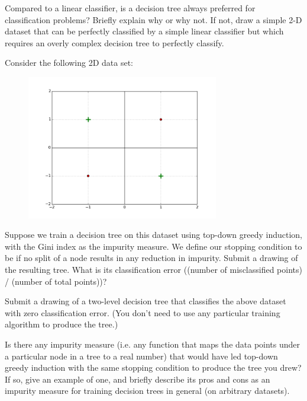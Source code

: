 \problem[4]
Compared to a linear classifier, is a decision tree always preferred for classification problems? Briefly explain why or why not. If not, draw a simple 2-D dataset that can be perfectly classified by a simple linear classifier but which requires an overly complex decision tree to perfectly classify.

\begin{solution}
  
\end{solution}

\problem[15]
Consider the following 2D data set:
\begin{figure}[H]
    \begin{center}
    \includegraphics[width=3.3in]{plots/3C.png}
    \end{center}
    \end{figure}

\subproblem[5] Suppose we train a decision tree on this dataset using top-down greedy induction, with the Gini index as
the impurity measure. We define our stopping condition to be if no split of a node
results in any reduction in impurity. Submit a drawing of the resulting tree.  What is its classification error ((number of misclassified points) / (number of total points))?

\subproblem[5] Submit a drawing of a two-level decision tree that classifies the above dataset with zero classification error.  (You don't need to use any particular training algorithm to produce the tree.)

Is there any impurity measure (i.e. any function that maps the data points under a particular node in a tree to a real number) that would have led top-down greedy induction with the same stopping condition to produce the tree you drew?  If so, give an example of one, and briefly describe its pros and cons as an impurity measure for training decision trees in general (on arbitrary datasets). 


